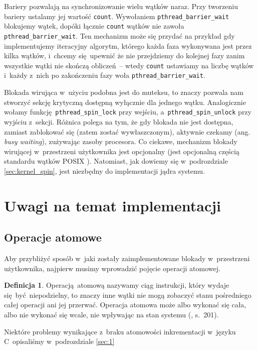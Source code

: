\documentclass[shortabstract]{iithesis}
\theoremstyle{definition} \newtheorem*{definition}{Definicja}
\theoremstyle{definition} \newtheorem*{example}{Przykład}
\theoremstyle{definition} \newtheorem*{remark}{Uwaga}
\begin{document}
Bariery pozwalają na synchronizowanie wielu wątków naraz. Przy tworzeniu bariery ustalamy jej wartość
\texttt{count}. Wywołaniem \texttt{pthread\_barrier\_wait} blokujemy wątek, dopóki łącznie \texttt{count} wątków
nie zawoła \texttt{pthread\_barrier\_wait}. Ten mechanizm może się przydać na przykład gdy implementujemy
iteracyjny algorytm, którego każda faza wykonywana jest przez kilka wątków, i~chcemy się upewnić że nie
przejdziemy do kolejnej fazy zanim wszystkie wątki nie skończą obliczeń~-- wtedy \texttt{count} ustawiamy
na liczbę wątków i~każdy z~nich po zakończeniu fazy woła \texttt{pthread\_barrier\_wait}.

Blokada wirująca w~użyciu podobna jest do muteksu, to znaczy pozwala nam stworzyć sekcję krytyczną dostępną
wyłącznie dla jednego wątku. Analogicznie wołamy funkcję \texttt{pthread\_spin\_lock} przy wejściu,
a~\texttt{pthread\_spin\_unlock} przy wyjściu z~sekcji. Różnica polega na tym,
że gdy blokada nie jest dostępna, zamiast zablokować się (zatem zostać wywłaszczonym), aktywnie czekamy
(ang. \textit{busy waiting}),
zużywając zasoby procesora. Co ciekawe, mechanizm blokady wirującej w~przestrzeni użytkownika jest
opcjonalny (jest opcjonalną częścią standardu wątków POSIX \cite{bib:pthreads:spin_optional}).
Natomiast, jak dowiemy się w~podrozdziale \ref{sec:kernel_spin}, jest niezbędny do implementacji jądra systemu.

\section{Uwagi na temat implementacji}

\subsection{Operacje atomowe}
\label{sec:atomic}
Aby przybliżyć sposób w~jaki zostały zaimplementowane blokady w~przestrzeni użytkownika,
najpierw musimy wprowadzić pojęcie operacji atomowej.

\begin{definition}
Operacją atomową nazywamy ciąg instrukcji, który wydaje się być niepodzielny, to znaczy
inne wątki nie mogą zobaczyć stanu pośredniego całej operacji ani jej przerwać. Operacja atomowa może
albo wykonać się cała, albo nie wykonać się wcale, nie wpływając na stan
systemu (\cite{bib:stallings}, s.~201).
\end{definition}

Niektóre problemy wynikające z~braku atomowości inkrementacji w~języku C~opisaliśmy w~podrozdziale \ref{sec:1}
\end{document}

